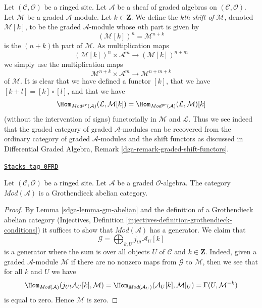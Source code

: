 \medskip\noindent
Let $(\mathcal{C}, \mathcal{O})$ be a ringed site.
Let $\mathcal{A}$ be a sheaf of graded algebras
on $(\mathcal{C}, \mathcal{O})$.
Let $\mathcal{M}$ be a graded $\mathcal{A}$-module. Let $k \in \mathbf{Z}$.
We define the {\it $k$th shift of} $\mathcal{M}$, denoted $\mathcal{M}[k]$,
to be the graded $\mathcal{A}$-module whose $n$th part is given by
$$
(\mathcal{M}[k])^n = \mathcal{M}^{n + k}
$$
is the $(n + k)$th part of $\mathcal{M}$. As multiplication maps
$$
(\mathcal{M}[k])^n \times \mathcal{A}^m
\longrightarrow
(\mathcal{M}[k])^{n + m}
$$
we simply use the multiplication maps
$$
\mathcal{M}^{n + k} \times \mathcal{A}^m
\longrightarrow
\mathcal{M}^{n + m + k}
$$
of $\mathcal{M}$. It is clear that we have defined a functor $[k]$,
that we have $[k + l] = [k] \circ [l]$, and that we have
$$
\Hom_{\textit{Mod}^{gr}(\mathcal{A})}(\mathcal{L}, \mathcal{M}[k]) =
\Hom_{\textit{Mod}^{gr}(\mathcal{A})}(\mathcal{L}, \mathcal{M})[k]
$$
(without the intervention of signs)
functorially in $\mathcal{M}$ and $\mathcal{L}$.
Thus we see indeed that the graded category of graded $\mathcal{A}$-modules
can be recovered from the ordinary category of graded $\mathcal{A}$-modules
and the shift functors as discussed in
Differential Graded Algebra, Remark \ref{dga-remark-graded-shift-functors}.

\begin{lemma}
\label{sdga-lemma-gm-grothendieck-abelian}
\href{https://stacks.math.columbia.edu/tag/0FRD}{\texttt{Stacks tag 0FRD}}

Let $(\mathcal{C}, \mathcal{O})$ be a ringed site.
Let $\mathcal{A}$ be a graded $\mathcal{O}$-algebra.
The category $\textit{Mod}(\mathcal{A})$ is a Grothendieck abelian category.
\end{lemma}

\begin{proof}

By Lemma \ref{sdga-lemma-gm-abelian} and the definition of a Grothendieck
abelian category
(Injectives, Definition \ref{injectives-definition-grothendieck-conditions})
it suffices to
show that $\textit{Mod}(\mathcal{A})$ has a generator. We claim that
$$
\mathcal{G} = \bigoplus\nolimits_{k, U} j_{U!}\mathcal{A}_U[k]
$$
is a generator where the sum is over all objects $U$ of $\mathcal{C}$
and $k \in \mathbf{Z}$. Indeed, given a graded $\mathcal{A}$-module
$\mathcal{M}$ if there are no nonzero maps from $\mathcal{G}$ to $\mathcal{M}$,
then we see that for all $k$ and $U$ we have
$$
\Hom_{\textit{Mod}(\mathcal{A})}(j_{U!}\mathcal{A}_U[k], \mathcal{M}) =
\Hom_{\textit{Mod}(\mathcal{A}_U)}(\mathcal{A}_U[k], \mathcal{M}|_U) =
\Gamma(U, \mathcal{M}^{-k})
$$
is equal to zero. Hence $\mathcal{M}$ is zero.
\end{proof}

